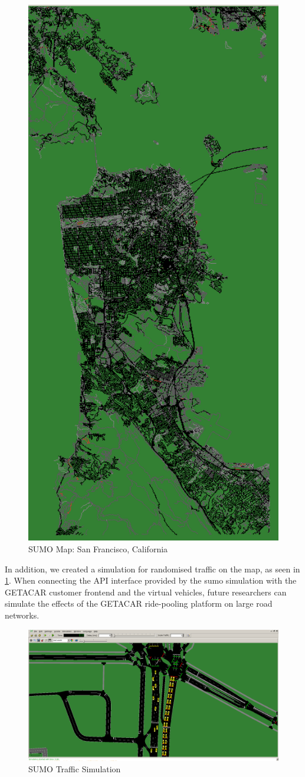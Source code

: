 \begin{figure}[h]
    \centering
    \includegraphics[width=0.40\linewidth]{data/ffss/sumo2.png}
    \caption{SUMO Map: San Francisco, California}
    \label{fig:Sumo2}
\end{figure}



In addition, we created a simulation for randomised traffic on the map, as seen in \ref{fig:Sumo2}. When connecting the API interface provided by the \gls{sumo} simulation with the GETACAR customer frontend and the virtual vehicles, future researchers can simulate the effects of the GETACAR ride-pooling platform on large road networks.

\begin{figure}[h]
    \centering
    \includegraphics[width=0.90\linewidth]{data/ffss/sumo1.png}
    \caption{SUMO Traffic Simulation}
    \label{fig:Sumo1}
\end{figure}






